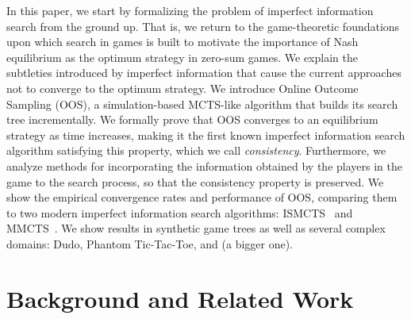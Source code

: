 \documentclass[letterpaper]{article}
\begin{document}
In this paper, we start by formalizing the problem of imperfect information search from the ground up. That is, we return to the game-theoretic 
foundations upon which search in games is built to motivate the importance of Nash equilibrium as the optimum strategy in zero-sum games. We explain the subtleties introduced by imperfect information that cause the current approaches not to converge to the optimum strategy. We introduce Online Outcome Sampling (OOS), a simulation-based MCTS-like algorithm that builds its search tree incrementally. 
We formally prove that OOS converges to an equilibrium strategy as time increases, making it the first 
known imperfect information search algorithm satisfying this property, which we call {\it consistency}. Furthermore, we analyze methods for incorporating the information obtained by the players in the game to the search process, so that the consistency property is preserved. We show the empirical convergence rates and performance of OOS, comparing them to two modern imperfect information search algorithms: 
ISMCTS~\cite{Cowling12ISMCTS} and MMCTS~\cite{Auger11Multiple}.
We show results in synthetic game trees as well as several complex domains: Dudo, Phantom Tic-Tac-Toe, 
and (a bigger one).



\section{Background and Related Work}
\end{document}

